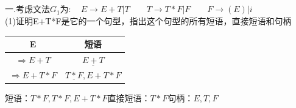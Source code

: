 \documentclass{article}
\title{
\vspace{2in}
\Huge{\textbf{\hmwkTitle}}\\
\vspace{2.5in}
}
\author{\textbf{\hmwkAuthorName}}
\date{\hmwkClassTime}
\begin{document}
\maketitle
\newpage
\noindent
一.考虑文法$G_{1}为:\quad E \rightarrow E+T|T  \qquad T \rightarrow T*F|F \qquad F \rightarrow (E)|i$\\
(1)证明E+T*F是它的一个句型，指出这个句型的所有短语，直接短语和句柄\\
\begin{center}
    \begin{tabular}{|c|c|}\hline
        E                   & 短语                    \\\hline
        $\Rightarrow E+T$   & $\underline{E+T}$       \\\hline
        $\Rightarrow E+T*F$ & $\underline{T*F},E+T*F$ \\\hline
    \end{tabular}
\end{center}

短语：$T*F,T*F,E+T*F$直接短语：$T*F$\qquad 句柄：$E,T,F$
\end{document}
